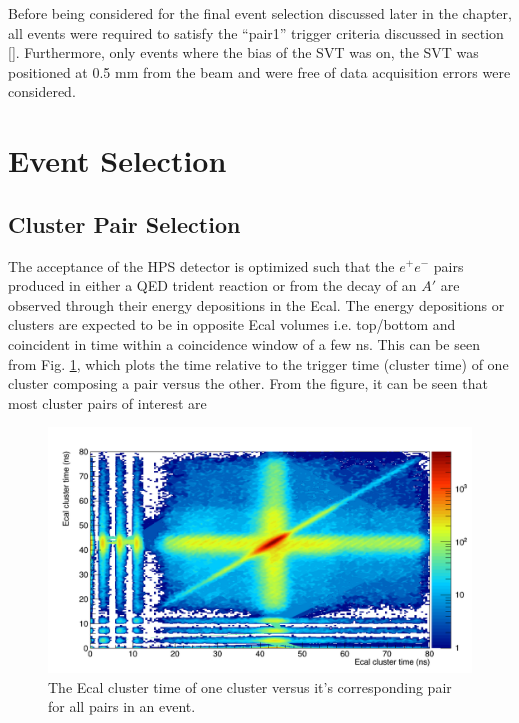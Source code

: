 Before being considered for the final event selection discussed later in the chapter, 
all events were required to satisfy the ``pair1'' trigger criteria 
discussed in section [].  Furthermore, only events where the bias of the SVT was
on, the SVT was positioned at 0.5 mm from the beam and were free of data 
acquisition errors were considered.

\section{Event Selection}

\subsection{Cluster Pair Selection}

The acceptance of the HPS detector is optimized such that the $e^+e^-$ pairs
produced in either a QED trident reaction or from the decay of an 
$A'$ are observed through their energy depositions in the Ecal.  The energy
depositions or clusters are expected to be in opposite Ecal volumes i.e. 
top/bottom and coincident in time within a coincidence window of a few ns.  This
can be seen from Fig. \ref{fig:cluster_times_2d}, which plots the time relative to 
the trigger time (cluster time) of one cluster composing a pair versus the 
other.  From the figure, it can be seen that most cluster pairs of interest are 
\begin{figure}[t]
    \centering
    \includegraphics[width=.9\textwidth]{images/20160428_pass4_cluster_time_v_cluster_time.png}
    \caption{The Ecal cluster time of one cluster versus it's corresponding pair for all
             pairs in an event.}
    \label{fig:cluster_times_2d}
\end{figure}  
